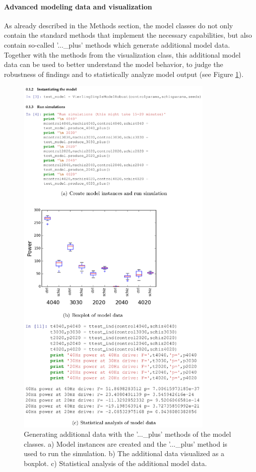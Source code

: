 \documentclass[CompPsych]{stjour}
\begin{document}
\paragraph{Advanced modeling data and visualization}
As already described in the Methods section, the model classes do not only contain the standard methods that implement the necessary capabilities, but also contain so-called '...\_plus' methods 
which generate additional model data. Together with the methods from the visualization class, this additional model data can be used to better understand the model behavior, 
to judge the robustness of findings and to statistically analyze model output (see Figure \ref{Fig:ModelPlusMethods}).

\begin{figure}
\includegraphics[width=0.85\textwidth]{Figures/figure-plus-methods}
\caption{Generating additional data with the '...\_plus' methods of the model classes. a) Model instances are created and the '...\_plus' method is used to run the simulation. b) The additional data visualized
as a boxplot. c) Statistical analysis of the additional model data.}
\label{Fig:ModelPlusMethods}
\end{figure}
\end{document}

